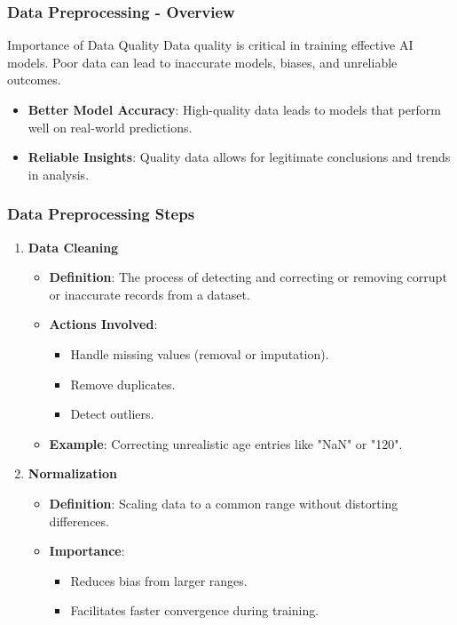 \documentclass{beamer}
\begin{document}
\begin{frame}[fragile]
    \frametitle{Data Preprocessing - Overview}

    \begin{block}{Importance of Data Quality}
        Data quality is critical in training effective AI models. Poor data can lead to inaccurate models, biases, and unreliable outcomes.
        \begin{itemize}
            \item \textbf{Better Model Accuracy}: High-quality data leads to models that perform well on real-world predictions.
            \item \textbf{Reliable Insights}: Quality data allows for legitimate conclusions and trends in analysis.
        \end{itemize}
    \end{block}
\end{frame}

\begin{frame}[fragile]
    \frametitle{Data Preprocessing Steps}

    \begin{enumerate}
        \item \textbf{Data Cleaning}
        \begin{itemize}
            \item \textbf{Definition}: The process of detecting and correcting or removing corrupt or inaccurate records from a dataset.
            \item \textbf{Actions Involved}:
            \begin{itemize}
                \item Handle missing values (removal or imputation).
                \item Remove duplicates.
                \item Detect outliers.
            \end{itemize}
            \item \textbf{Example}: Correcting unrealistic age entries like "NaN" or "120".
        \end{itemize}

        \item \textbf{Normalization}
        \begin{itemize}
            \item \textbf{Definition}: Scaling data to a common range without distorting differences.
            \item \textbf{Importance}:
            \begin{itemize}
                \item Reduces bias from larger ranges.
                \item Facilitates faster convergence during training.
            \end{itemize}
        \end{itemize}
    \end{enumerate}
\end{frame}
\end{document}
